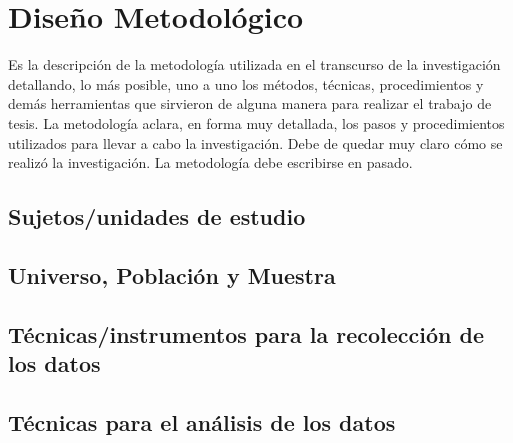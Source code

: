\chapter{Diseño Metodológico}

Es la descripción de la metodología utilizada en el transcurso de la investigación detallando, lo más posible, uno a uno los métodos, técnicas, procedimientos y demás herramientas que sirvieron de alguna manera para realizar el trabajo de tesis. 
La metodología aclara, en forma muy detallada, los pasos y procedimientos utilizados para llevar a cabo la investigación. Debe de quedar muy claro cómo se realizó la investigación. La metodología debe escribirse en pasado.

\section{Sujetos/unidades de estudio}
\section{Universo, Población y Muestra }
\section{Técnicas/instrumentos para la recolección de los datos}
\section{Técnicas para el análisis de los datos}
